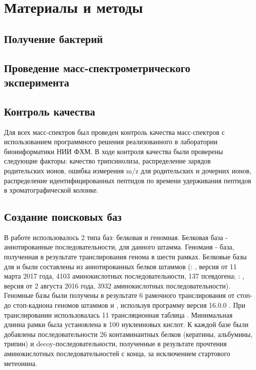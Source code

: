 \section{Материалы и методы}

\subsection{Получение бактерий}

\subsection{Проведение масс-спектрометрического эксперимента}

\subsection{Контроль качества}
Для всех масс-спектров был проведен контроль качества масс-спектров с использованием программного решения реализованного в лаборатории биоинформатики НИИ ФХМ. В ходе контроля качества были проверены следующие факторы: качество трипсинолиза, распределение зарядов родительских ионов, ошибка измерения m/z для родительских и дочерних ионов, распределение идентифицированных пептидов по времени удерживания пептидов в хроматографической колонке.

\subsection{Создание поисковых баз}
В работе использовалось 2 типа баз: белковая и геномная. Белковая база - аннотированные последовательности, для данного штамма. Геноманя - база, полученная в результате транслирования генома в шести рамках.
Белковые базы для  и  были составлены из аннотированных белков штаммов (: , версия от 11 марта 2017 года, 4103 аминокислотных последовательности, 137 псевдогена; : , версия от 2 августа 2016 года, 3932 аминокислотных последовательности).
Геномные базы были получены в результате 6 рамочного транслирования от стоп- до стоп-каднона геномов штаммов  и , используя программу  версия 16.0.0 \cite{rutherford2000artemis}. При транслировании использовалась 11 трансляционная таблица . Минимальная длинна рамки была установлена в 100 нуклеиновых кислот.
К каждой базе были добавлены последовательности 26 контаминантных белков (кератины, альбумины, трипин) и decoy-последовательности, полученные в результате прочтения аминокислотных последовательностей с конца, за исключением стартового метеонина. 

